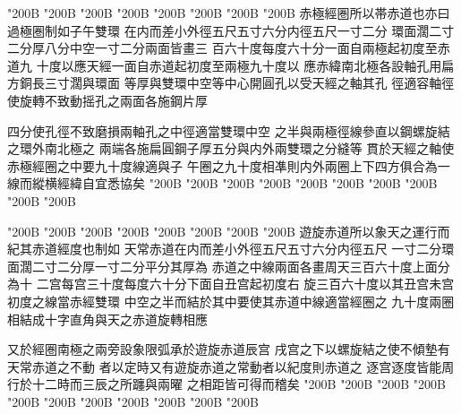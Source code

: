 \begin{正文}
\char"200B\relax{}
\char"200B\relax{}
\char"200B\relax{}
\char"200B\relax{}
\char"200B\relax{}
\char"200B\relax{}
\char"200B\relax{}
\char"200B\relax{}
赤極經圏所以帯赤道也亦曰過極圏制如子午雙環
在内而差小外徑五尺五寸六分内徑五尺一寸二分
環面濶二寸二分厚八分中空一寸二分兩面皆畫三
百六十度每度六十分一面自兩極起初度至赤道九
十度以應天經一面自赤道起初度至兩極九十度以
應赤緯南北極各設軸孔用扁方銅長三寸濶與環面
等厚與雙環中空等中心開圓孔以受天經之軸其孔
徑適容軸徑使旋轉不致動摇孔之兩面各施鋼片厚
\par
四分使孔徑不致磨損兩軸孔之中徑適當雙環中空
之半與兩極徑線參直以鋼螺旋結之環外南北極之
兩端各施扁圓鋼子厚五分與内外兩雙環之分縫等
貫於天經之軸使赤極經圈之中要九十度線適與子
午圈之九十度相凖則内外兩圈上下四方俱合為一
線而縱横經緯自宜悉協矣
\char"200B\relax{}
\char"200B\relax{}
\char"200B\relax{}
\char"200B\relax{}
\char"200B\relax{}
\char"200B\relax{}
\char"200B\relax{}
\char"200B\relax{}
\char"200B\relax{}
\char"200B\relax
\par
\end{正文}\clearpage
{}
\begin{正文}
\char"200B\relax{}
\char"200B\relax{}
\char"200B\relax{}
\char"200B\relax{}
\char"200B\relax{}
\char"200B\relax{}
\char"200B\relax{}
\char"200B\relax{}
遊旋赤道所以象天之運行而紀其赤道經度也制如
天常赤道在内而差小外徑五尺五寸六分内徑五尺
一寸二分環面濶二寸二分厚一寸二分平分其厚為
赤道之中線兩面各畫周天三百六十度上面分為十
二宫每宫三十度每度六十分下面自丑宫起初度右
旋三百六十度以其丑宫未宫初度之線當赤經雙環
中空之半而結於其中要使其赤道中線適當經圈之
九十度兩圈相結成十字直角與天之赤道旋轉相應
\par
又於經圏南極之兩旁設象限弧承於遊旋赤道辰宫
戌宫之下以螺旋結之使不傾墊有天常赤道之不動
者以定時又有遊旋赤道之常動者以紀度則赤道之
逐宫逐度皆能周行於十二時而三辰之所躔與兩曜
之相距皆可得而稽矣
\char"200B\relax{}
\char"200B\relax{}
\char"200B\relax{}
\char"200B\relax{}
\char"200B\relax{}
\char"200B\relax{}
\char"200B\relax{}
\char"200B\relax{}
\char"200B\relax{}
\char"200B\relax{}
\char"200B\relax
\par
\end{正文}\clearpage
